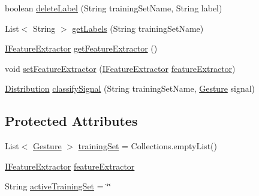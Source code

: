 \begin{DoxyCompactItemize}
boolean \hyperlink{classde_1_1dfki_1_1ccaal_1_1gestures_1_1classifier_1_1_gesture_classifier_aee5e7b400fab5df4558a36dd5c44ec21}{delete\-Label} (String training\-Set\-Name, String label)
\item 
List$<$ String $>$ \hyperlink{classde_1_1dfki_1_1ccaal_1_1gestures_1_1classifier_1_1_gesture_classifier_a17fde6db6683c5f8c64f7cef5ce5235f}{get\-Labels} (String training\-Set\-Name)
\item 
\hyperlink{interfacede_1_1dfki_1_1ccaal_1_1gestures_1_1classifier_1_1feature_extraction_1_1_i_feature_extractor}{I\-Feature\-Extractor} \hyperlink{classde_1_1dfki_1_1ccaal_1_1gestures_1_1classifier_1_1_gesture_classifier_a285a498b2668baedd7e4d24b66799cc3}{get\-Feature\-Extractor} ()
\item 
void \hyperlink{classde_1_1dfki_1_1ccaal_1_1gestures_1_1classifier_1_1_gesture_classifier_aaa9fcc9ca5c45efb2d637aa87c558528}{set\-Feature\-Extractor} (\hyperlink{interfacede_1_1dfki_1_1ccaal_1_1gestures_1_1classifier_1_1feature_extraction_1_1_i_feature_extractor}{I\-Feature\-Extractor} \hyperlink{classde_1_1dfki_1_1ccaal_1_1gestures_1_1classifier_1_1_gesture_classifier_aebcb0670efed8b559e4affcb5f350693}{feature\-Extractor})
\item 
\hyperlink{classde_1_1dfki_1_1ccaal_1_1gestures_1_1classifier_1_1_distribution}{Distribution} \hyperlink{classde_1_1dfki_1_1ccaal_1_1gestures_1_1classifier_1_1_gesture_classifier_ad5882f0d7ac6ebadaccea21cfb588fc3}{classify\-Signal} (String training\-Set\-Name, \hyperlink{classde_1_1dfki_1_1ccaal_1_1gestures_1_1_gesture}{Gesture} signal)
\end{DoxyCompactItemize}
\subsection*{Protected Attributes}
\begin{DoxyCompactItemize}
\item 
List$<$ \hyperlink{classde_1_1dfki_1_1ccaal_1_1gestures_1_1_gesture}{Gesture} $>$ \hyperlink{classde_1_1dfki_1_1ccaal_1_1gestures_1_1classifier_1_1_gesture_classifier_a7d526d1e046e33325660aeed7469322e}{training\-Set} = Collections.\-empty\-List()
\item 
\hyperlink{interfacede_1_1dfki_1_1ccaal_1_1gestures_1_1classifier_1_1feature_extraction_1_1_i_feature_extractor}{I\-Feature\-Extractor} \hyperlink{classde_1_1dfki_1_1ccaal_1_1gestures_1_1classifier_1_1_gesture_classifier_aebcb0670efed8b559e4affcb5f350693}{feature\-Extractor}
\item 
String \hyperlink{classde_1_1dfki_1_1ccaal_1_1gestures_1_1classifier_1_1_gesture_classifier_a1aa607ffc0c99977b134334be176806c}{active\-Training\-Set} = \char`\"{}\char`\"{}
\end{DoxyCompactItemize}



